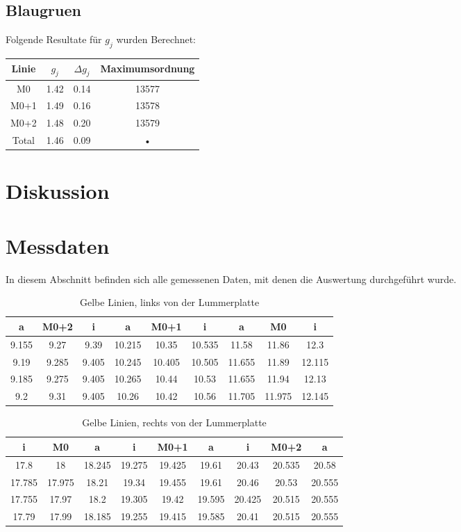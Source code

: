 \documentclass[a4paper,parskip,11pt, DIV12]{scrreprt}
\begin{document}
	\section{Blaugruen}
	Folgende Resultate für $g_j$ wurden Berechnet:
	
\begin{tabular}{|c|c|c|c|}
\hline 
Linie  & $g_j$ & $\Delta g_j$ & Maximumsordnung \\ 
\hline 
M0 & 1.42 & 0.14 & 13577 \\ 
\hline 
M0+1 & 1.49 & 0.16 & 13578 \\ 
\hline 
M0+2 & 1.48 & 0.20 & 13579 \\ 
\hline 
Total & 1.46 & 0.09 & • \\ 
\hline 
\end{tabular} 

	\chapter{Diskussion}
	
	\chapter{Messdaten}
	In diesem Abschnitt befinden sich alle gemessenen Daten, mit denen die Auswertung durchgeführt wurde.
	
	\begin{table}[H]
	\begin{tabular}{|c|c|c||c|c|c||c|c|c|}
	\hline 
a	&	M0+2	&	i	&	a	&	M0+1	&	i	&	a	&	M0	&	i	\\
	\hline
	\hline
9.155	&	9.27	&	9.39	&	10.215	&	10.35	&	10.535	&	11.58	&	11.86	&	12.3	\\
	\hline
9.19	&	9.285	&	9.405	&	10.245	&	10.405	&	10.505	&	11.655	&	11.89	&	12.115	\\
	\hline
9.185	&	9.275	&	9.405	&	10.265	&	10.44	&	10.53	&	11.655	&	11.94	&	12.13	\\
	\hline
9.2	&	9.31	&	9.405	&	10.26	&	10.42	&	10.56	&	11.705	&	11.975	&	12.145	\\
	\hline
	\end{tabular}
	\caption{Gelbe Linien, links von der Lummerplatte}
	\end{table}
	
	\begin{table}[H]	
	\begin{tabular}{|c|c|c||c|c|c||c|c|c|}
	\hline 
i	&	M0	&	a	&	i	&	M0+1	&	a	&	i	&	M0+2	&	a	\\
	\hline
	\hline
17.8	&	18	&	18.245	&	19.275	&	19.425	&	19.61	&	20.43	&	20.535	&	20.58	\\
	\hline
17.785	&	17.975	&	18.21	&	19.34	&	19.455	&	19.61	&	20.46	&	20.53	&	20.555	\\
	\hline
17.755	&	17.97	&	18.2	&	19.305	&	19.42	&	19.595	&	20.425	&	20.515	&	20.555	\\
	\hline
17.79	&	17.99	&	18.185	&	19.255	&	19.415	&	19.585	&	20.41	&	20.515	&	20.555	\\
	\hline
	\end{tabular} 
	\caption{Gelbe Linien, rechts von der Lummerplatte}
	\end{table}
	
\end{document}
